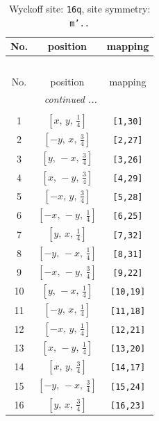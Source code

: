 \documentclass[fleqn,8pt]{jsarticle}
\begin{document}
\begin{longtable}{ccc}
\caption{Wyckoff site: {\tt 16q}, site symmetry: {\tt m'..}}
 \\
 \hline \hline
No. & position & mapping \\ \hline \endfirsthead

\multicolumn{2}{l}{\tablename\ \thetable{}} \\
 \hline \hline
No. & position & mapping \\ \hline \endhead

 \hline \hline
\multicolumn{2}{r}{\footnotesize\it continued ...} \\ \endfoot

 \hline \hline
\multicolumn{2}{r}{} \\ \endlastfoot

1 & $\left[ x,\, y,\, \frac{1}{4} \right]$ & {\tt [1,30]} \\ \hline
2 & $\left[ - y,\, x,\, \frac{3}{4} \right]$ & {\tt [2,27]} \\ \hline
3 & $\left[ y,\, - x,\, \frac{3}{4} \right]$ & {\tt [3,26]} \\ \hline
4 & $\left[ x,\, - y,\, \frac{3}{4} \right]$ & {\tt [4,29]} \\ \hline
5 & $\left[ - x,\, y,\, \frac{3}{4} \right]$ & {\tt [5,28]} \\ \hline
6 & $\left[ - x,\, - y,\, \frac{1}{4} \right]$ & {\tt [6,25]} \\ \hline
7 & $\left[ y,\, x,\, \frac{1}{4} \right]$ & {\tt [7,32]} \\ \hline
8 & $\left[ - y,\, - x,\, \frac{1}{4} \right]$ & {\tt [8,31]} \\ \hline
9 & $\left[ - x,\, - y,\, \frac{3}{4} \right]$ & {\tt [9,22]} \\ \hline
10 & $\left[ y,\, - x,\, \frac{1}{4} \right]$ & {\tt [10,19]} \\ \hline
11 & $\left[ - y,\, x,\, \frac{1}{4} \right]$ & {\tt [11,18]} \\ \hline
12 & $\left[ - x,\, y,\, \frac{1}{4} \right]$ & {\tt [12,21]} \\ \hline
13 & $\left[ x,\, - y,\, \frac{1}{4} \right]$ & {\tt [13,20]} \\ \hline
14 & $\left[ x,\, y,\, \frac{3}{4} \right]$ & {\tt [14,17]} \\ \hline
15 & $\left[ - y,\, - x,\, \frac{3}{4} \right]$ & {\tt [15,24]} \\ \hline
16 & $\left[ y,\, x,\, \frac{3}{4} \right]$ & {\tt [16,23]} \\
\end{longtable}
\end{document}
